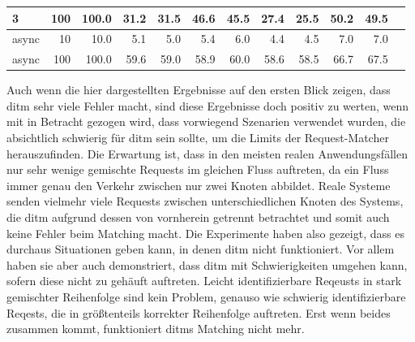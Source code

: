 \documentclass[12pt,a4paper]{report}
\begin{document}
\begin{table}[H]
\begin{tabular}{|l|r|r|r|r|r|r|r|r|r|r|r|}
		3                        & 100                                & 100.0                           & 31.2                        & 31.5                      & 46.6                           & 45.5 & 27.4 & 25.5 & 50.2 & 49.5 \\ \hline
		async                    & 10                                 & 10.0                            & 5.1                         & 5.0                       & 5.4                            & 6.0  & 4.4  & 4.5  & 7.0  & 7.0  \\ \hline
		async                    & 100                                & 100.0                           & 59.6                        & 59.0                      & 58.9                           & 60.0 & 58.6 & 58.5 & 66.7 & 67.5 \\ \hline
	\end{tabular}
\end{table}

Auch wenn die hier dargestellten Ergebnisse auf den ersten Blick zeigen, dass ditm sehr viele Fehler macht, sind diese Ergebnisse
doch positiv zu werten, wenn mit in Betracht gezogen wird, dass vorwiegend Szenarien verwendet wurden, die absichtlich schwierig
für ditm sein sollte, um die Limits der Request-Matcher herauszufinden. Die Erwartung ist, dass in den meisten realen Anwendungsfällen
nur sehr wenige gemischte Requests im gleichen Fluss auftreten, da ein Fluss immer genau den Verkehr zwischen nur zwei Knoten
abbildet. Reale Systeme senden vielmehr viele Requests zwischen unterschiedlichen Knoten des Systems, die ditm aufgrund
dessen von vornherein getrennt betrachtet und somit auch keine Fehler beim Matching macht. Die Experimente haben also gezeigt,
dass es durchaus Situationen geben kann, in denen ditm nicht funktioniert. Vor allem haben sie aber auch demonstriert, dass ditm
mit Schwierigkeiten umgehen kann, sofern diese nicht zu gehäuft auftreten. Leicht identifizierbare Reqeusts in stark gemischter
Reihenfolge sind kein Problem, genauso wie schwierig identifizierbare Reqests, die in größtenteils korrekter Reihenfolge
auftreten. Erst wenn beides zusammen kommt, funktioniert ditms Matching nicht mehr.
\end{document}
